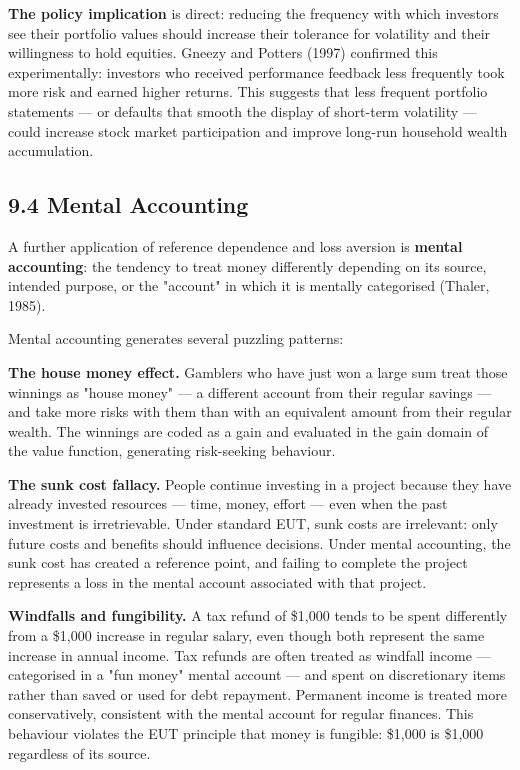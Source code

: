 \documentclass[12pt, letterpaper]{article}
\begin{document}
\textbf{The policy implication} is direct: reducing the frequency with which investors see their portfolio values should increase their tolerance for volatility and their willingness to hold equities. Gneezy and Potters (1997) confirmed this experimentally: investors who received performance feedback less frequently took more risk and earned higher returns. This suggests that less frequent portfolio statements --- or defaults that smooth the display of short-term volatility --- could increase stock market participation and improve long-run household wealth accumulation.


\subsection{9.4 Mental Accounting}


A further application of reference dependence and loss aversion is \textbf{mental accounting}: the tendency to treat money differently depending on its source, intended purpose, or the "account" in which it is mentally categorised (Thaler, 1985).

Mental accounting generates several puzzling patterns:

\textbf{The house money effect.} Gamblers who have just won a large sum treat those winnings as "house money" --- a different account from their regular savings --- and take more risks with them than with an equivalent amount from their regular wealth. The winnings are coded as a gain and evaluated in the gain domain of the value function, generating risk-seeking behaviour.

\textbf{The sunk cost fallacy.} People continue investing in a project because they have already invested resources --- time, money, effort --- even when the past investment is irretrievable. Under standard EUT, sunk costs are irrelevant: only future costs and benefits should influence decisions. Under mental accounting, the sunk cost has created a reference point, and failing to complete the project represents a loss in the mental account associated with that project.

\textbf{Windfalls and fungibility.} A tax refund of \$1,000 tends to be spent differently from a \$1,000 increase in regular salary, even though both represent the same increase in annual income. Tax refunds are often treated as windfall income --- categorised in a "fun money" mental account --- and spent on discretionary items rather than saved or used for debt repayment. Permanent income is treated more conservatively, consistent with the mental account for regular finances. This behaviour violates the EUT principle that money is fungible: \$1,000 is \$1,000 regardless of its source.
\end{document}
